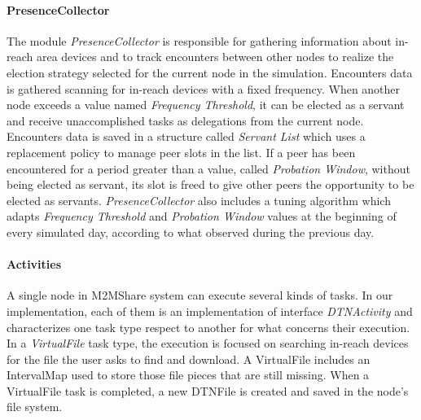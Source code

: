 
\paragraph{PresenceCollector}
The module \textit{PresenceCollector} is responsible for gathering information about in-reach area devices and to track encounters between other nodes to realize the election strategy selected for the current node in the simulation. Encounters data is gathered scanning for in-reach devices with a fixed frequency. When another node exceeds a value named \textit{Frequency Threshold}, it can be elected as a servant and receive unaccomplished tasks as delegations from the current node. Encounters data is saved in a structure called \textit{Servant List} which uses a replacement policy to manage peer slots in the list. If a peer has been encountered for a period greater than a value, called \textit{Probation Window}, without being elected as servant, its slot is freed to give other peers the opportunity to be elected as servants. \textit{PresenceCollector} also includes a tuning algorithm which adapts \textit{Frequency Threshold} and \textit{Probation Window} values at the beginning of every simulated day, according to what observed during the previous day.


\paragraph{Activities}
A single node in M2MShare system can execute several kinds of tasks. In our implementation, each of them is an implementation of interface \textit{DTNActivity} and characterizes one task type respect to another for what concerns their execution. 
\\

In a \textit{VirtualFile} task type, the execution is focused on searching in-reach devices for the file the user asks to find and download. A VirtualFile includes an IntervalMap used to store those file pieces that are still missing. When a VirtualFile task is completed, a new DTNFile is created and saved in the node's file system. 
\\

